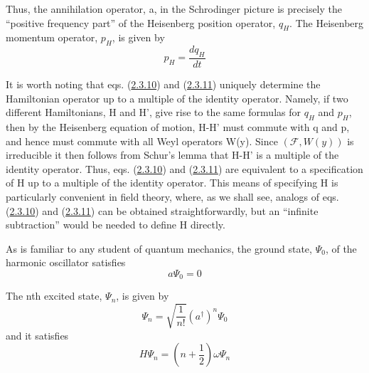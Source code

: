 \documentclass[11pt,a4paper]{article}
\begin{document}
Thus, the annihilation operator, a, in the Schrodinger picture is precisely the ``positive frequency part'' of the Heisenberg position operator, \(q_H\). The Heisenberg momentum operator, \(p_H\), is given by
\begin{equation*}
p_{H} = \frac{dq_{H}}{dt} \tag{2.3.11}\label{eq:2.3.11}
\end{equation*}

It is worth noting that eqs. (\hyperref[eq:2.3.10]{2.3.10}) and (\hyperref[eq:2.3.11]{2.3.11}) uniquely determine the Hamiltonian operator up to a multiple of the identity operator. Namely, if two different Hamiltonians, H and H', give rise to the same formulas for \(q_H\) and \(p_H\), then by the Heisenberg equation of motion, H-H' must commute with q and p, and hence must commute with all Weyl operators W(y). Since \((\mathcal{F}, W(y))\) is irreducible it then follows from Schur's lemma that H-H' is a multiple of the identity operator. Thus, eqs. (\hyperref[eq:2.3.10]{2.3.10}) and (\hyperref[eq:2.3.11]{2.3.11}) are equivalent to a specification of H up to a multiple of the identity operator. This means of specifying H is particularly convenient in field theory, where, as we shall see, analogs of eqs. (\hyperref[eq:2.3.10]{2.3.10}) and (\hyperref[eq:2.3.11]{2.3.11}) can be obtained straightforwardly, but an ``infinite subtraction'' would be needed to define H directly.

As is familiar to any student of quantum mechanics, the ground state, \(\Psi_0\), of the harmonic oscillator satisfies
\begin{equation*}
a\Psi_0=0 \tag{2.3.12}\label{eq:2.3.12}
\end{equation*}

The nth excited state, \(\Psi_n\), is given by
\begin{equation*}
\Psi_n = \sqrt{\frac{1}{n!}} (a^{\dagger})^n \Psi_0 \tag{2.3.13}\label{eq:2.3.13}
\end{equation*}
and it satisfies
\begin{equation*}
H\Psi_n = \left(n + \frac{1}{2}\right) \omega \Psi_n \tag{2.3.14}\label{eq:2.3.14}
\end{equation*}

\hypertarget{source-37}{}
\end{document}
